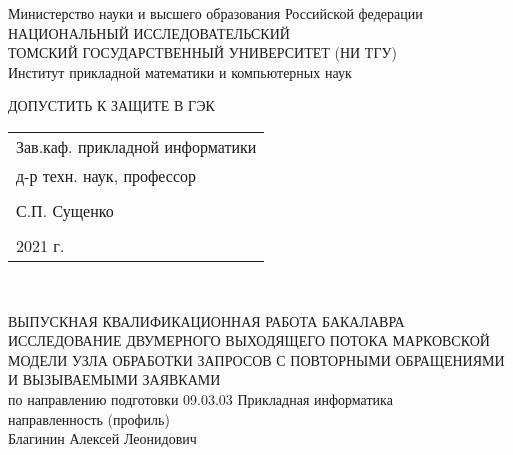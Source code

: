 	\begin{center}\linespread{1}
		\large{Министерство науки и высшего образования Российской федерации}\\
		\footnotesize{НАЦИОНАЛЬНЫЙ ИССЛЕДОВАТЕЛЬСКИЙ}\\ 
		\footnotesize{ТОМСКИЙ ГОСУДАРСТВЕННЫЙ УНИВЕРСИТЕТ (НИ ТГУ)}\\
		\footnotesize{Институт прикладной математики и компьютерных наук}\\
		\hfill\break
		
	\end{center}
\begin{flushright}\linespread{0.9}
	\normalsize{ДОПУСТИТЬ К ЗАЩИТЕ В ГЭК}\\ 
	\normalsize{ 
		\begin{tabular}{@{}l@{}}
			Зав.каф. прикладной информатики\\  д-р техн. наук,  профессор\\\\ \underline{\hspace{3.5cm}} С.П. Сущенко\\\\
			\textquote{\underline{\hspace{1cm}}}\underline{\hspace{4cm}}2021 г.	
		\end{tabular}	
	}\\
\end{flushright}
\hfill \break
\hfill \break
\hfill \break
\begin{center}\linespread{1}
		\large{ВЫПУСКНАЯ КВАЛИФИКАЦИОННАЯ РАБОТА БАКАЛАВРА}\\
		\hfill \break
		\large{ИССЛЕДОВАНИЕ ДВУМЕРНОГО ВЫХОДЯЩЕГО ПОТОКА МАРКОВСКОЙ МОДЕЛИ УЗЛА ОБРАБОТКИ ЗАПРОСОВ С ПОВТОРНЫМИ ОБРАЩЕНИЯМИ И ВЫЗЫВАЕМЫМИ ЗАЯВКАМИ}\\
		\hfill \break
		\normalsize{по направлению подготовки 09.03.03 Прикладная информатика\\
		направленность (профиль)  \\
		\hfill \break
	Благинин Алексей Леонидович}\\
		\hfill \break
		\hfill \break
	\end{center}

